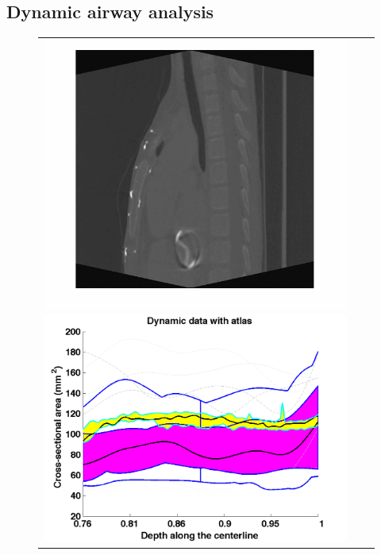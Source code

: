 \subsection{Dynamic airway analysis}
\label{sec:dynamic_airway_analysis}
\begin{figure}[tb]
  \begin{center}
    \begin{tabular}{ccc}
    \includegraphics[height=\figheight] {fig/Fleck_007.png}
    \includegraphics[width=\figwidth] {fig/Fleck_007_wfbplot.png} \\

\end{tabular}
\end{center}
\end{figure}

